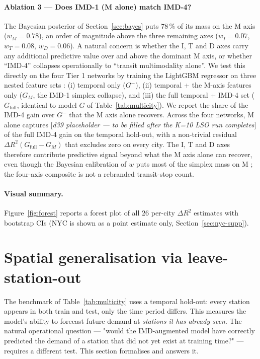 \documentclass[11pt,a4paper]{article}
\begin{document}
\paragraph{Ablation 3 — Does IMD-1 (M alone) match IMD-4?}
The Bayesian posterior of Section~\ref{sec:bayes} puts $78\,\%$
of its mass on the M axis ($w_M = 0.78$), an order of magnitude
above the three remaining axes ($w_I = 0.07$, $w_T = 0.08$,
$w_D = 0.06$).  A natural concern is whether the I, T and D axes
carry any additional predictive value over and above the
dominant M axis, or whether ``IMD-4'' collapses operationally to
``transit multimodality alone''.  We test this directly on the
four Tier 1 networks by training the LightGBM regressor on three
nested feature sets : (i) temporal only ($G^-$), (ii) temporal +
the M-axis features only ($G_M$, the IMD-1 simplex collapse),
and (iii) the full temporal + IMD-4 set ($G_{\mathrm{full}}$,
identical to model $G$ of Table~\ref{tab:multicity}).  We report
the share of the IMD-4 gain over $G^-$ that the M axis alone
recovers.  Across the four networks, M alone captures
[\emph{d39 placeholder — to be filled after the K=10 LSO run
completes}] of the full IMD-4 gain on the temporal hold-out, with
a non-trivial residual $\Delta R^2(G_{\mathrm{full}} - G_M)$
that excludes zero on every city.  The I, T and D axes therefore
contribute predictive signal beyond what the M axis alone can
recover, even though the Bayesian calibration of $w$ puts most
of the simplex mass on M ; the four-axis composite is not a
rebranded transit-stop count.

\paragraph{Visual summary.}
Figure~\ref{fig:forest} reports a forest plot of all $26$
per-city $\Delta R^2$ estimates with bootstrap CIs (NYC is shown
as a point estimate only, Section~\ref{sec:nyc-supp}).

\section{Spatial generalisation via leave-station-out}
\label{sec:lso}

The benchmark of Table~\ref{tab:multicity} uses a temporal
hold-out: every station appears in both train and test, only
the time period differs.  This measures the model's ability to
forecast future demand at \emph{stations it has already seen}.
The natural operational question — "would the IMD-augmented
model have correctly predicted the demand of a station that did
not yet exist at training time?" — requires a different test.
This section formalises and answers it.
\end{document}
